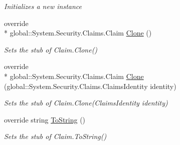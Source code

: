 \begin{DoxyCompactItemize}
\begin{DoxyCompactList}\small\item\em Initializes a new instance\end{DoxyCompactList}\item 
override \\*
global\-::\-System.\-Security.\-Claims.\-Claim \hyperlink{class_system_1_1_security_1_1_claims_1_1_fakes_1_1_stub_claim_a1a2ca942ffeb0ad7ad75586be2b194f4}{Clone} ()
\begin{DoxyCompactList}\small\item\em Sets the stub of Claim.\-Clone()\end{DoxyCompactList}\item 
override \\*
global\-::\-System.\-Security.\-Claims.\-Claim \hyperlink{class_system_1_1_security_1_1_claims_1_1_fakes_1_1_stub_claim_aff157c435a0205a56c3daaf53d1e7c23}{Clone} (global\-::\-System.\-Security.\-Claims.\-Claims\-Identity identity)
\begin{DoxyCompactList}\small\item\em Sets the stub of Claim.\-Clone(\-Claims\-Identity identity)\end{DoxyCompactList}\item 
override string \hyperlink{class_system_1_1_security_1_1_claims_1_1_fakes_1_1_stub_claim_a15fae61bdc68db132922ea3e369b1aeb}{To\-String} ()
\begin{DoxyCompactList}\small\item\em Sets the stub of Claim.\-To\-String()\end{DoxyCompactList}\end{DoxyCompactItemize}
